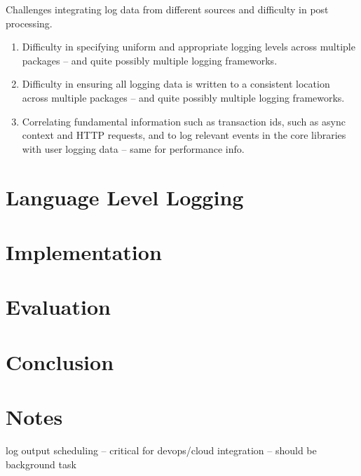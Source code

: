 \documentclass[twocolumn,10pt]{article}
\begin{document}
\noindent
Challenges integrating log data from different sources and difficulty in post processing.
\begin{enumerate}
\item Difficulty in specifying uniform and appropriate logging levels across 
    multiple packages -- and quite possibly multiple logging frameworks.
\item Difficulty in ensuring all logging data is written to a consistent location 
    across multiple packages -- and quite possibly multiple logging frameworks.
\item Correlating fundamental information such as  
    transaction ids, such as async context and HTTP requests, and to log relevant 
    events in the core libraries with user logging data -- same for performance info.
\end{enumerate}

\section{Language Level Logging}

\section{Implementation}

\section{Evaluation}

\section{Conclusion}

\section{Notes} log output scheduling -- critical for devops/cloud integration
-- should be background task
\end{document}

